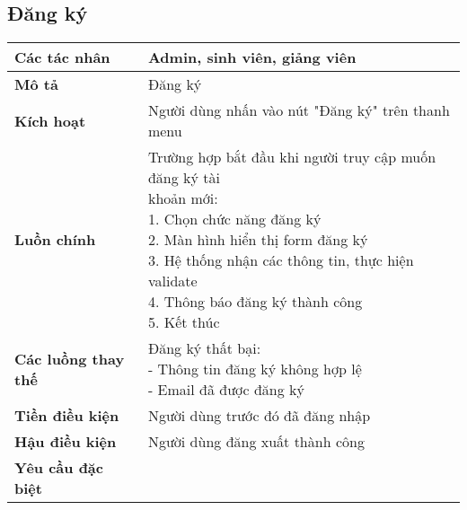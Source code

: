 	\subsection*{Đăng ký}
	\begin{tabular}{|l|p{}|}
		\hline
		\textbf{Các tác nhân}       & Admin, sinh viên, giảng viên                                        \\
		\hline
		\textbf{Mô tả}              & Đăng ký                                                             \\
		\hline
		\textbf{Kích hoạt}          & Người dùng nhấn vào nút "Đăng ký" trên thanh menu                   \\
		\hline
		\textbf{Luồn chính}         & \makecell[l]{Trường hợp bắt đầu khi người truy cập muốn đăng ký tài \\khoản mới: \\ 1. Chọn chức năng đăng ký \\ 2. Màn hình hiển thị form đăng ký \\ 3. Hệ thống nhận các thông tin, thực hiện validate \\ 4. Thông báo đăng ký thành công \\ 5. Kết thúc} \\
		\hline
		\textbf{Các luồng thay thế} & \makecell[l]{Đăng ký thất bại:                                      \\ - Thông tin đăng ký không hợp lệ \\ - Email đã được đăng ký} \\
		\hline
		\textbf{Tiền điều kiện}     & Người dùng trước đó đã đăng nhập                                    \\
		\hline
		\textbf{Hậu điều kiện}      & Người dùng đăng xuất thành công                                     \\
		\hline
		\textbf{Yêu cầu đặc biệt}   &                                                                     \\
		\hline
	\end{tabular}

